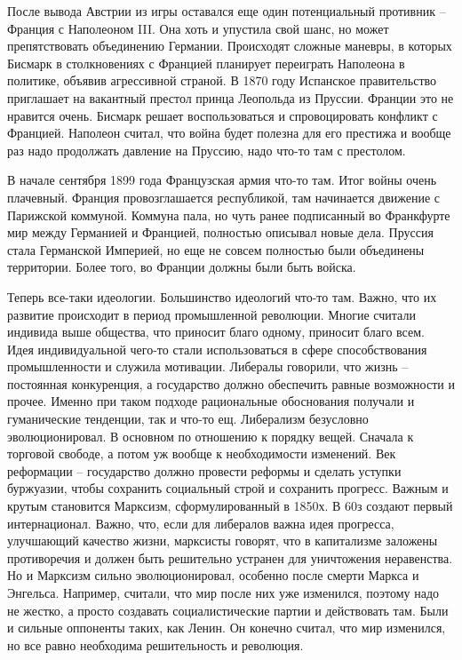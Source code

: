 \documentclass[a4paper, 12pt]{article}
\begin{document}
\begin{multicols}{2}
После вывода Австрии из игры оставался еще один потенциальный противник -- Франция с Наполеоном III. Она хоть и упустила свой шанс, но может препятствовать объединению Германии. Происходят сложные маневры, в которых Бисмарк в столкновениях с Францией планирует переиграть Наполеона в политике, объявив агрессивной страной. В 1870 году Испанское правительство приглашает на вакантный престол принца Леопольда из Пруссии. Франции это не нравится очень. Бисмарк решает воспользоваться и спровоцировать конфликт с Францией. Наполеон считал, что война будет полезна для его престижа и вообще раз надо продолжать давление на Пруссию, надо что-то там с престолом. 

В начале сентября 1899 года Французская армия что-то там. Итог войны очень плачевный. Франция провозглашается республикой, там начинается движение с Парижской коммуной. Коммуна пала, но чуть ранее подписанный во Франкфурте мир между Германией и Францией, полностью описывал новые дела. Пруссия стала Германской Империей, но еще не совсем полностью были объединены территории. Более того, во Франции должны были быть войска. 


Теперь все-таки идеологии. Большинство идеологий что-то там. Важно, что их развитие происходит в период промышленной революции. Многие считали индивида выше общества, что приносит благо одному, приносит благо всем. Идея индивидуальной чего-то стали использоваться в сфере способствования промышленности и служила мотивации. Либералы говорили, что жизнь -- постоянная конкуренция, а государство должно обеспечить равные возможности и прочее. Именно при таком подходе рациональные обоснования получали и гуманические тенденции, так и что-то ещ. Либерализм безусловно эволюционировал. В основном по отношению к порядку вещей. Сначала к торговой свободе, а потом уж вообще к необходимости изменений. Век реформации -- государство должно провести реформы и сделать уступки буржуазии, чтобы сохранить социальный строй и сохранить прогресс. Важным и крутым становится Марксизм, сформулированный в 1850х. В 60з создают первый интернационал. Важно, что, если для либералов важна идея прогресса, улучшающий качество жизни, марксисты говорят, что в капитализме заложены противоречия и должен быть решительно устранен для уничтожения неравенства. Но и Марксизм сильно эволюционировал, особенно после смерти Маркса и Энгельса. Например, считали, что мир после них уже изменился, поэтому надо не жестко, а просто создавать социалистические партии и действовать там. Были и сильные оппоненты таких, как Ленин. Он конечно считал, что мир изменился, но все равно необходима решительность и революция. 


\end{multicols}
\end{document}
